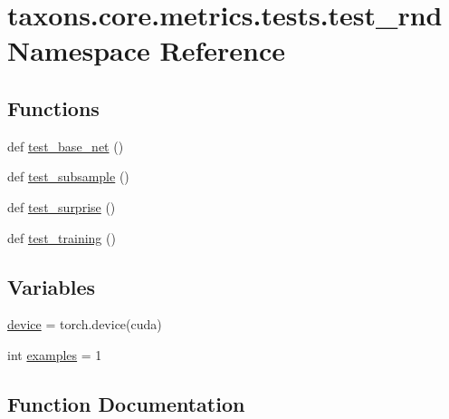 \hypertarget{namespacetaxons_1_1core_1_1metrics_1_1tests_1_1test__rnd}{}\section{taxons.\+core.\+metrics.\+tests.\+test\+\_\+rnd Namespace Reference}
\label{namespacetaxons_1_1core_1_1metrics_1_1tests_1_1test__rnd}
\subsection*{Functions}
\begin{DoxyCompactItemize}
\item 
def \hyperlink{namespacetaxons_1_1core_1_1metrics_1_1tests_1_1test__rnd_a9d38516d58bda46ca920f901e82433dc}{test\+\_\+base\+\_\+net} ()
\item 
def \hyperlink{namespacetaxons_1_1core_1_1metrics_1_1tests_1_1test__rnd_a530a8aba34b9bb6fd7c323a6f17699dc}{test\+\_\+subsample} ()
\item 
def \hyperlink{namespacetaxons_1_1core_1_1metrics_1_1tests_1_1test__rnd_ad58c3cef4431bc9680cc567e0cf9226c}{test\+\_\+surprise} ()
\item 
def \hyperlink{namespacetaxons_1_1core_1_1metrics_1_1tests_1_1test__rnd_a0185b226499e1adf356c9e2cb00d4566}{test\+\_\+training} ()
\end{DoxyCompactItemize}
\subsection*{Variables}
\begin{DoxyCompactItemize}
\item 
\hyperlink{namespacetaxons_1_1core_1_1metrics_1_1tests_1_1test__rnd_a74205189dfe19ca443438d5905ac8a02}{device} = torch.\+device(\textquotesingle{}cuda\textquotesingle{})
\item 
int \hyperlink{namespacetaxons_1_1core_1_1metrics_1_1tests_1_1test__rnd_a89e03490f9c803ff0dfa956429e1bde9}{examples} = 1
\end{DoxyCompactItemize}


\subsection{Function Documentation}

